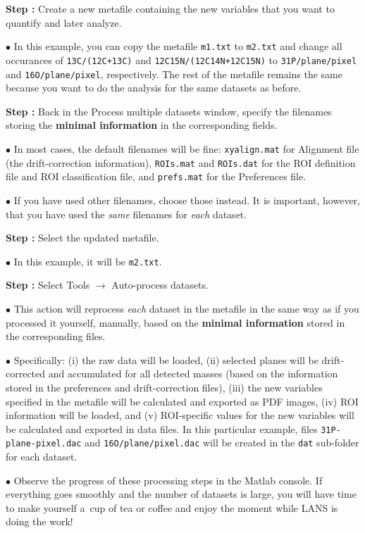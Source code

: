 \documentclass[a4paper, 11pt]{article}
\newcommand{\ttt}[1]{\texttt{#1}}
\newcommand{\lans}[1]{{\color{magenta}#1}}
\newcommand{\lanstf}[1]{{\color{cyan}#1}}
\newcommand\ra{\rightarrow}
\newcounter{step}
\newcommand\s{\addtocounter{step}{1}\vskip5pt\noindent\textbf{Step \thestep:}{ }}
\newcommand\bul{\vskip5pt\noindent$\bullet${ }}
\newcommand\bb[1]{\textbf{#1}}
\begin{document}
\s Create a new metafile containing the new variables that you want to quantify and later analyze. 

\bul In this example, you can copy the metafile \ttt{m1.txt} to \ttt{m2.txt} and change all occurances of \ttt{13C/(12C+13C)} and \ttt{12C15N/(12C14N+12C15N)} to \ttt{31P/plane/pixel}	and \ttt{16O/plane/pixel}, respectively. The rest of the metafile remains the same because you want to do the analysis for the same datasets as before.

\s Back in the \lans{Process multiple datasets} window, specify the filenames storing the \bb{minimal information} in the corresponding \lanstf{fields}.

\bul In most cases, the default filenames will be fine: \ttt{xyalign.mat} for \lanstf{Alignment file} (the drift-correction information), \ttt{ROIs.mat} and \ttt{ROIs.dat} for the \lanstf{ROI definition file} and \lanstf{ROI classification file}, and \ttt{prefs.mat} for the \lanstf{Preferences file}. 

\bul If you have used other filenames, choose those instead. It is important, however, that you have used the \emph{same} filenames for \emph{each} dataset.

\s Select the updated \lanstf{metafile}.

\bul In this example, it will be \ttt{m2.txt}.

\s Select \lans{Tools} $\ra$ \lans{Auto-process datasets}.

\bul This action will reprocess \emph{each} dataset in the metafile in the same way as if you processed it yourself, manually, based on the \bb{minimal information} stored in the corresponding files. 

\bul Specifically: (i) the raw data will be loaded, (ii) selected planes will be drift-corrected and accumulated for all detected masses (based on the information stored in the preferences and drift-correction files), (iii) the new variables specified in the metafile will be calculated and exported as PDF images, (iv) ROI information will be loaded, and (v) ROI-specific values for the new variables will be calculated and exported in data files. In this particular example, files \ttt{31P-plane-pixel.dac} and \ttt{16O/plane/pixel.dac} will be created in the \ttt{dat} sub-folder for each dataset.

\bul Observe the progress of these processing steps in the Matlab console. If everything goes smoothly and the number of datasets is large, you will have time to make yourself a~cup of tea or coffee and enjoy the moment while LANS is doing the work! 
\end{document}

